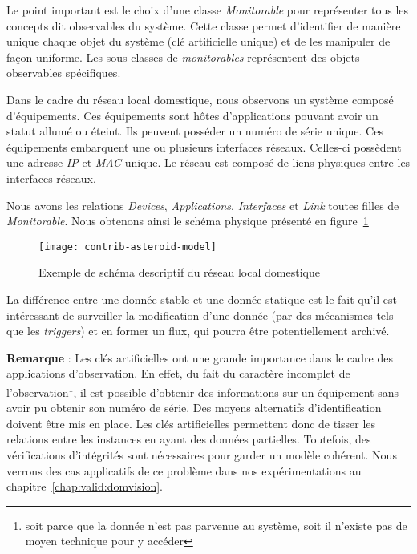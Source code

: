 Le point important est le choix d'une classe \textit{Monitorable} pour représenter tous les concepts dit observables du système. Cette classe permet d'identifier de manière unique chaque objet du système (clé artificielle unique) et de les manipuler de façon uniforme. Les sous-classes de \textit{monitorables} représentent des objets observables spécifiques.

\begin{example}
	Dans le cadre du réseau local domestique, nous observons un système composé d'équipements. Ces équipements sont hôtes d'applications pouvant avoir un statut allumé ou éteint. Ils peuvent posséder un numéro de série unique. Ces équipements embarquent une ou plusieurs interfaces réseaux. Celles-ci possèdent une adresse \textit{IP} et \textit{MAC} unique. Le réseau est composé de liens physiques entre les interfaces réseaux.
	
	Nous avons les relations \textit{Devices}, \textit{Applications}, \textit{Interfaces} et \textit{Link} toutes filles de \textit{Monitorable}. Nous obtenons ainsi le schéma physique présenté en figure~\ref{fig:contrib:asteroid:theorie:model}
	\begin{figure}[ht]
                \centering
		\texttt{[image: contrib-asteroid-model]}
		\caption{Exemple de schéma descriptif du réseau local domestique}\label{fig:contrib:asteroid:theorie:model}
	\end{figure}
\end{example}

La différence entre une donnée stable et une donnée statique est le fait qu'il est intéressant de surveiller la modification d'une donnée (par des mécanismes tels que les \textit{triggers}) et en former un flux, qui pourra être potentiellement archivé.

\textbf{Remarque} : Les clés artificielles ont une grande importance dans le cadre des applications d'observation. En effet, du fait du caractère incomplet de l'observation\footnote{soit parce que la donnée n'est pas parvenue au système, soit il n'existe pas de moyen technique pour y accéder}, il est possible d'obtenir des informations sur un équipement sans avoir pu obtenir son numéro de série. Des moyens alternatifs d'identification doivent être mis en place. Les clés artificielles permettent donc de tisser les relations entre les instances en ayant des données partielles. Toutefois, des vérifications d'intégrités sont nécessaires pour garder un modèle cohérent. Nous verrons des cas applicatifs de ce problème dans nos expérimentations au chapitre~\ref{chap:valid:domvision}.


